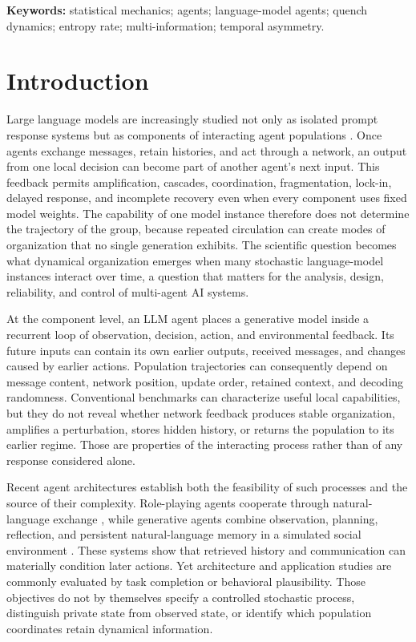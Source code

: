 \documentclass[12pt]{article}
\begin{document}
\noindent\textbf{Keywords:} statistical mechanics; agents; language-model
agents; quench dynamics; entropy rate; multi-information; temporal asymmetry.

\section{Introduction}
\label{sec:introduction}

Large language models are increasingly studied not only as isolated
prompt response systems but as components of interacting agent populations
\cite{wang2024agents,guo2024multiagents}.  Once agents exchange messages,
retain histories, and act through a network, an output from one local decision
can become part of another agent's next input.  This feedback permits
amplification, cascades, coordination, fragmentation, lock-in, delayed
response, and incomplete recovery even when every component uses fixed model
weights.  The capability of one model instance therefore does not determine
the trajectory of the group, because repeated circulation can create modes of
organization that no single generation exhibits.  The scientific question
becomes what dynamical organization emerges when many stochastic
language-model instances interact
over time, a question that matters for the analysis, design, reliability, and
control of multi-agent AI systems.

At the component level, an LLM agent places a generative model inside a
recurrent loop of observation, decision, action, and environmental feedback.
Its future inputs can contain its own earlier outputs, received messages, and
changes caused by earlier actions.  Population trajectories can consequently
depend on message content, network position, update order, retained context,
and decoding randomness.  Conventional benchmarks can characterize useful
local capabilities, but they do not reveal whether network feedback produces
stable organization, amplifies a perturbation, stores hidden history, or
returns the population to its earlier regime.  Those are properties of the
interacting process rather than of any response considered alone.

Recent agent architectures establish both the feasibility of such processes
and the source of their complexity.  Role-playing agents cooperate through
natural-language exchange \cite{li2023camel}, while generative agents combine
observation, planning, reflection, and persistent natural-language memory in a
simulated social environment \cite{park2023generative}.  These systems show
that retrieved history and communication can materially condition later
actions.  Yet architecture and application studies are commonly evaluated by
task completion or behavioral plausibility.  Those objectives do not by
themselves specify a controlled stochastic process, distinguish private state
from observed state, or identify which population coordinates retain
dynamical information.
\end{document}
